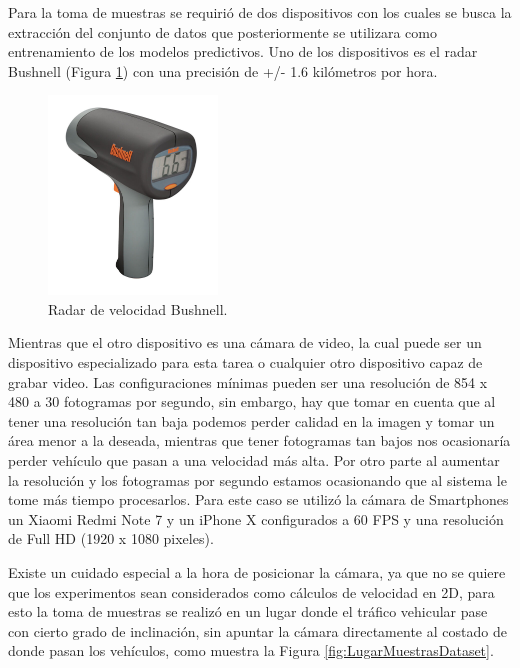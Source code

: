 Para la toma de muestras se requirió de dos dispositivos con los cuales se busca la extracción del conjunto de datos que posteriormente se utilizara como entrenamiento de los modelos predictivos. Uno de los dispositivos es el radar Bushnell (Figura \ref{fig:RadarVelocidad}) con una precisión de +/- 1.6 kilómetros por hora.

\begin{figure}[H]
    \centering
    \includegraphics[width=0.4\textwidth]{Metodologia/imgs/bushnell.jpg}
    \caption{Radar de velocidad Bushnell.}
    \label{fig:RadarVelocidad}
\end{figure}

Mientras que el otro dispositivo es una cámara de video, la cual puede ser un dispositivo especializado para esta tarea o cualquier otro dispositivo capaz de grabar video. Las configuraciones mínimas pueden ser una resolución de 854 x 480 a 30 fotogramas por segundo, sin embargo, hay que tomar en cuenta que al tener una resolución tan baja podemos perder calidad en la imagen y tomar un área menor a la deseada, mientras que tener fotogramas tan bajos nos ocasionaría perder vehículo que pasan a una velocidad más alta. Por otro parte al aumentar la resolución y los fotogramas por segundo estamos ocasionando que al sistema le tome más tiempo procesarlos. Para este caso se utilizó la cámara de Smartphones un Xiaomi Redmi Note 7 y un iPhone X configurados a 60 FPS y una resolución de Full HD (1920 x 1080 pixeles).

Existe un cuidado especial a la hora de posicionar la cámara, ya que no se quiere que los experimentos sean considerados como cálculos de velocidad en 2D, para esto la toma de muestras se realizó en un lugar donde el tráfico vehicular pase con cierto grado de inclinación, sin apuntar la cámara directamente al costado de donde pasan los vehículos, como muestra la Figura \ref{fig:LugarMuestrasDataset}.

